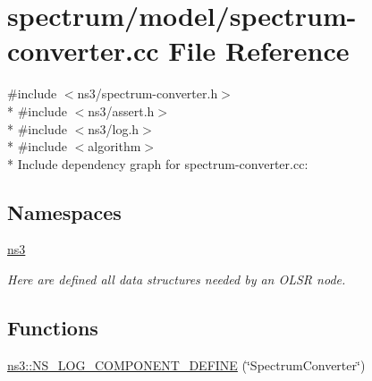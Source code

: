 \hypertarget{spectrum-converter_8cc}{}\section{spectrum/model/spectrum-\/converter.cc File Reference}
\label{spectrum-converter_8cc}
{\ttfamily \#include $<$ns3/spectrum-\/converter.\+h$>$}\\*
{\ttfamily \#include $<$ns3/assert.\+h$>$}\\*
{\ttfamily \#include $<$ns3/log.\+h$>$}\\*
{\ttfamily \#include $<$algorithm$>$}\\*
Include dependency graph for spectrum-\/converter.cc\+:
\subsection*{Namespaces}
\begin{DoxyCompactItemize}
\item 
 \hyperlink{namespacens3}{ns3}
\begin{DoxyCompactList}\small\item\em Here are defined all data structures needed by an O\+L\+SR node. \end{DoxyCompactList}\end{DoxyCompactItemize}
\subsection*{Functions}
\begin{DoxyCompactItemize}
\item 
\hyperlink{namespacens3_a39704cdcf406ce0a07de83a7726f4da2}{ns3\+::\+N\+S\+\_\+\+L\+O\+G\+\_\+\+C\+O\+M\+P\+O\+N\+E\+N\+T\+\_\+\+D\+E\+F\+I\+NE} (\char`\"{}Spectrum\+Converter\char`\"{})
\end{DoxyCompactItemize}
